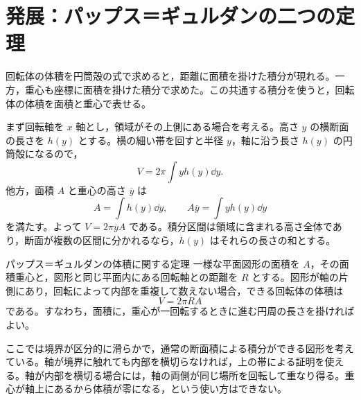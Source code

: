 \section{発展：パップス＝ギュルダンの二つの定理}\label{節:パップスの定理}

回転体の体積を円筒殻の式で求めると，距離に面積を掛けた積分が現れる。一方，重心も座標に面積を掛けた積分で求めた。この共通する積分を使うと，回転体の体積を面積と重心で表せる。

まず回転軸を $x$ 軸とし，領域がその上側にある場合を考える。高さ $y$ の横断面の長さを $h(y)$ とする。横の細い帯を回すと半径 $y$，軸に沿う長さ $h(y)$ の円筒殻になるので，
\[
V=2\pi\int y h(y)\dd y.
\]
他方，面積 $A$ と重心の高さ $\overline y$ は
\[
A=\int h(y)\dd y,\qquad
A\overline y=\int y h(y)\dd y
\]
を満たす。よって $V=2\pi\overline y A$ である。積分区間は領域に含まれる高さ全体であり，断面が複数の区間に分かれるなら，$h(y)$ はそれらの長さの和とする。

\begin{theorem}{パップス＝ギュルダンの体積に関する定理}
一様な平面図形の面積を $A$，その面積重心と，図形と同じ平面内にある回転軸との距離を $R$ とする。図形が軸の片側にあり，回転によって内部を重複して数えない場合，できる回転体の体積は
\[
V=2\pi R A
\]
である。すなわち，面積に，重心が一回転するときに進む円周の長さを掛ければよい。
\end{theorem}

ここでは境界が区分的に滑らかで，通常の断面積による積分ができる図形を考えている。軸が境界に触れても内部を横切らなければ，上の帯による証明を使える。軸が内部を横切る場合には，軸の両側が同じ場所を回転して重なり得る。重心が軸上にあるから体積が零になる，という使い方はできない。

%
